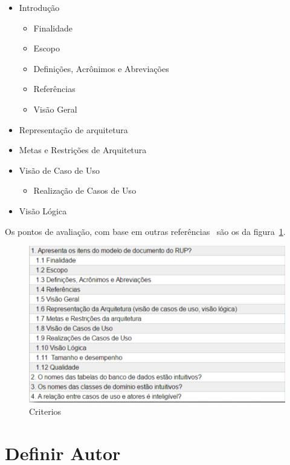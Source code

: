     \begin{itemize}
        \item Introdução
            \begin{itemize}
                \item Finalidade     
                \item Escopo     
                \item Definições, Acrônimos e Abreviações     
                \item Referências     
                \item Visão Geral
            \end{itemize}
        \item Representação de arquitetura
        \item Metas e Restrições de Arquitetura
        \item Visão de Caso de Uso 
            \begin{itemize}
                \item Realização de Casos de Uso
            \end{itemize}
        \item Visão Lógica
    \end{itemize}

    Os pontos de avaliação, com base em outras referências~\cite{stafford2004creating}\cite{clements2002documenting} são os da figura~\ref{fig:criterios}.

\begin{figure}[H]
  \center
  \includegraphics[width=1\textwidth]{figuras/criterios.png}
  \caption{Criterios}
  \label{fig:criterios}
\end{figure}

\section{Definir Autor}

